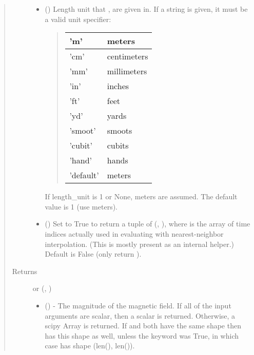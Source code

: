 \documentclass[letterpaper,10pt,english]{sphinxmanual}
\begin{document}
\begin{fulllineitems}
\begin{fulllineitems}
\begin{quote}
\begin{description}
\begin{itemize}
\item {} 
 () \textendash{} 
Length unit that ,  are given in.
If a string is given, it must be a valid unit specifier:
\begin{quote}


\begin{savenotes}\sphinxattablestart
\centering
\begin{tabulary}{\linewidth}[t]{|T|T|}
\hline

’m’
&
meters
\\
\hline
’cm’
&
centimeters
\\
\hline
’mm’
&
millimeters
\\
\hline
’in’
&
inches
\\
\hline
’ft’
&
feet
\\
\hline
’yd’
&
yards
\\
\hline
’smoot’
&
smoots
\\
\hline
’cubit’
&
cubits
\\
\hline
’hand’
&
hands
\\
\hline
’default’
&
meters
\\
\hline
\end{tabulary}
\par
\sphinxattableend\end{savenotes}
\end{quote}

If length\_unit is 1 or None, meters are assumed. The default
value is 1 (use meters).


\item {} 
 () \textendash{} Set to True to return a tuple of (,
), where  is the array of time indices
actually used in evaluating  with nearest-neighbor
interpolation. (This is mostly present as an internal helper.)
Default is False (only return ).

\end{itemize}

\item[{Returns}] \leavevmode

 or (, )
\begin{itemize}
\item {} 
 () - The magnitude of the magnetic
field. If all of the input arguments are scalar, then a scalar is
returned. Otherwise, a scipy Array is returned. If  and 
both have the same shape then  has this shape as well, unless
the  keyword was True, in which case  has shape
(len(), len()).


\end{itemize}
\end{description}
\end{quote}
\end{fulllineitems}
\end{fulllineitems}
\end{document}
